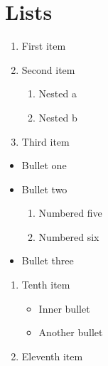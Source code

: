 \documentclass{article}
\begin{document}
\section{Lists}

\begin{enumerate}
\item First item
\item Second item
\begin{enumerate}
\item Nested a
\item Nested b
\end{enumerate}
\item Third item
\end{enumerate}

\begin{itemize}
\item Bullet one
\item Bullet two
\begin{enumerate}[start=5]
\item Numbered five
\item Numbered six
\end{enumerate}
\item Bullet three
\end{itemize}

\begin{enumerate}[start=10]
\item Tenth item
\begin{itemize}
\item Inner bullet
\item Another bullet
\end{itemize}
\item Eleventh item
\end{enumerate}
\end{document}
